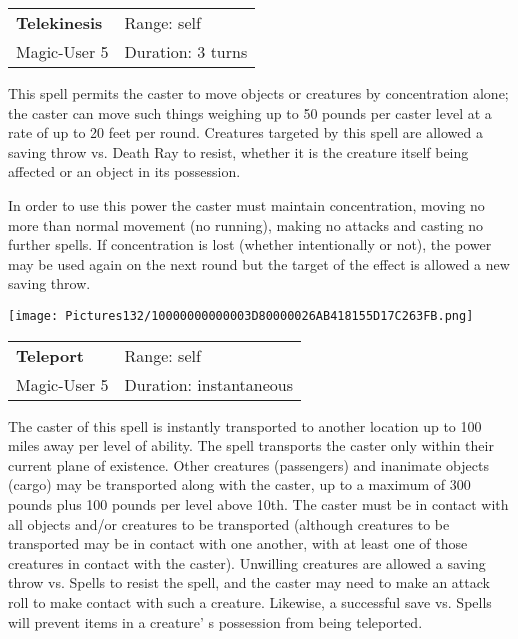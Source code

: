 \documentclass[a4paper,twoside,openany,10pt]{book}
\begin{document}
\begin{multicols}{2}
\smallskip\begin{flushleft} 
	\begin{tabularx}{0.45\textwidth}{@{}m{3.5cm}m{5.5cm}@{}} 
		\textbf{Telekinesis} & Range: self\\
Magic-User 5 &Duration: 3 turns\\
	\end{tabularx}\end{flushleft}

This spell permits the caster to move objects or creatures by concentration alone; the caster can move such things weighing up to 50 pounds per caster level at a rate of up to 20 feet per round. Creatures targeted by this spell are allowed a saving throw vs. Death Ray to resist, whether it is the creature itself being affected or an object in its possession.

In order to use this power the caster must maintain concentration, moving no more than normal movement (no running), making no attacks and casting no further spells. If concentration is lost (whether intentionally or not), the power may be used again on the next round but the target of the effect is allowed a new saving throw.

\medskip

\begin{flushleft}
	\texttt{[image: Pictures132/10000000000003D80000026AB418155D17C263FB.png]}
\end{flushleft}

\smallskip\begin{flushleft} 
	\begin{tabularx}{0.45\textwidth}{@{}m{3.5cm}m{5.5cm}@{}} 
		\textbf{Teleport} & Range: self\\
Magic-User 5 &Duration: instantaneous\\
	\end{tabularx}\end{flushleft}

The caster of this spell is instantly transported to another location up to 100 miles away per level of ability. The spell transports the caster only within their current plane of existence. Other creatures (passengers) and inanimate objects (cargo) may be transported along with the caster, up to a maximum of 300 pounds plus 100 pounds per level above 10th. The caster must be in contact with all objects and/or creatures to be transported (although creatures to be transported may be in contact with one another, with at least one of those creatures in contact with the caster). Unwilling creatures are allowed a saving throw vs. Spells to resist the spell, and the caster may need to make an attack roll to make contact with such a creature. Likewise, a successful save vs. Spells will prevent items in a creature' s possession from being teleported.


\end{multicols}
\end{document}
